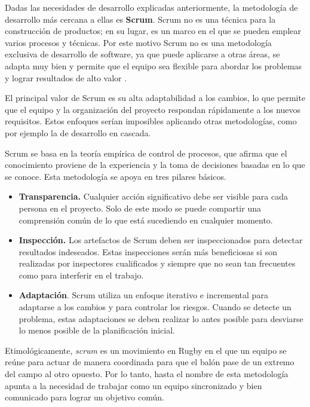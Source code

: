 Dadas las necesidades de desarrollo explicadas anteriormente, la metodología de desarrollo más cercana a ellas es \textbf{Scrum}. Scrum no es una técnica para la construcción de productos; en su lugar, es un marco en el que se pueden emplear varios procesos y técnicas. Por este motivo Scrum no es una metodología exclusiva de desarrollo de software, ya que puede aplicarse a otras áreas, se adapta muy bien y permite que el equipo sea flexible para abordar los problemas y lograr resultados de alto valor \cite{scrum-guide}.

El principal valor de Scrum es su alta adaptabilidad a los cambios, lo que permite que el equipo y la organización del proyecto respondan rápidamente a los nuevos requisitos. Estos enfoques serían imposibles aplicando otras metodologías, como por ejemplo la de desarrollo en cascada.

Scrum se basa en la teoría empírica de control de procesos, que afirma que el conocimiento proviene de la experiencia y la toma de decisiones basadas en lo que se conoce. Esta metodología se apoya en tres pilares básicos.

\begin{itemize}
    \item \textbf{Transparencia.} Cualquier acción significativo debe ser visible para cada persona en el proyecto. Solo de este modo se puede compartir una comprensión común de lo que está sucediendo en cualquier momento.
    
    \item \textbf{Inspección.} Los artefactos de Scrum deben ser inspeccionados para detectar resultados indeseados. Estas inspecciones serán más beneficiosas si son realizadas por inspectores cualificados y siempre que no sean tan frecuentes como para interferir en el trabajo.

    \item \textbf{Adaptación}. Scrum utiliza un enfoque iterativo e incremental para adaptarse a los cambios y para controlar los riesgos. Cuando se detecte un problema, estas adaptaciones se deben realizar lo antes posible para desviarse lo menos posible de la planificación inicial.
\end{itemize}

Etimológicamente, \textit{scrum} es un movimiento en Rugby en el que un equipo se reúne para actuar de manera coordinada para que el balón pase de un extremo del campo al otro opuesto. Por lo tanto, hasta el nombre de esta metodología apunta a la necesidad de trabajar como un equipo sincronizado y bien comunicado para lograr un objetivo común.

